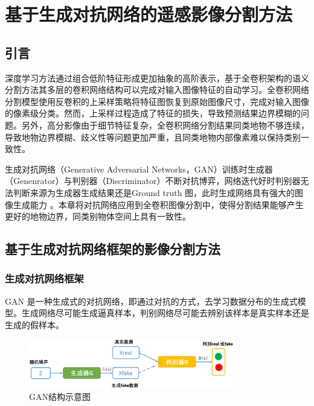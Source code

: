 
\chapter{基于生成对抗网络的遥感影像分割方法}
\label{cha:chap04}

\section{引言}
深度学习方法通过组合低阶特征形成更加抽象的高阶表示，基于全卷积架构的语义分割方法其多层的卷积网络结构可以完成对输入图像特征的自动学习。全卷积网络分割模型使用反卷积的上采样策略将特征图恢复到原始图像尺寸，完成对输入图像的像素级分类。然而，上采样过程造成了特征的损失，导致预测结果边界模糊的问题。另外，高分影像由于细节特征复杂，全卷积网络分割结果同类地物不够连续，导致地物边界模糊、歧义性等问题更加严重，且同类地物内部像素难以保持类别一致性。

生成对抗网络（Generative Adversarial Networks，GAN）训练时生成器（Genenrator）与判别器（Discriminator）不断对抗博弈，网络迭代好时判别器无法判断来源为生成器生成结果还是Ground truth 图，此时生成网络具有强大的图像生成能力\cite{luc2016semantic} 。本章将对抗网络应用到全卷积图像分割中，使得分割结果能够产生更好的地物边界，同类别物体空间上具有一致性。


\section{基于生成对抗网络框架的影像分割方法}
\label{sec:firtst}

\subsection{生成对抗网络框架}
\label{sec:first-1}
GAN 是一种生成式的对抗网络，即通过对抗的方式，去学习数据分布的生成式模型。生成网络尽可能生成逼真样本，判别网络尽可能去辨别该样本是真实样本还是生成的假样本。

\begin{figure}[htb]
  \centering
  \includegraphics[width=0.8\textwidth]{figures/gan}
  \caption{GAN结构示意图}\label{fig:gan}
\end{figure}


